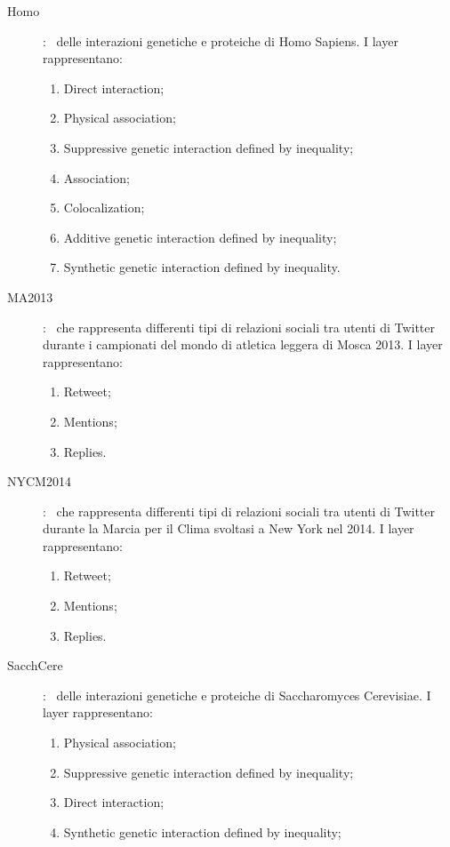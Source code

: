 \begin{description}
    \item[Homo]: \mulx\ delle interazioni genetiche e proteiche di 
    Homo Sapiens. I layer rappresentano:
    \begin{enumerate}
        \item Direct interaction;
        \item Physical association;
        \item Suppressive genetic interaction defined by inequality;
        \item Association;
        \item Colocalization;
        \item Additive genetic interaction defined by inequality;
        \item Synthetic genetic interaction defined by inequality.
    \end{enumerate} 
    \item[MA2013]: \mulx\ che rappresenta differenti tipi di relazioni sociali 
        tra utenti di Twitter durante i campionati del mondo di atletica leggera 
        di Mosca 2013.
        I layer rappresentano:
        \begin{enumerate}
            \item Retweet;
            \item Mentions;
            \item Replies.
        \end{enumerate}
    \item[NYCM2014]: \mulx\ che rappresenta differenti tipi di relazioni sociali 
        tra utenti di Twitter durante la Marcia per il Clima svoltasi a New York nel 2014.
        I layer rappresentano:
        \begin{enumerate}
            \item Retweet;
            \item Mentions;
            \item Replies.
        \end{enumerate}
    \item[SacchCere]: \mulx\ delle interazioni genetiche e proteiche di 
        Saccharomyces Cerevisiae. I layer rappresentano:
        \begin{enumerate}
            \item Physical association;
            \item Suppressive genetic interaction defined by inequality;
            \item Direct interaction;
            \item Synthetic genetic interaction defined by inequality;

\end{enumerate}
\end{description}
